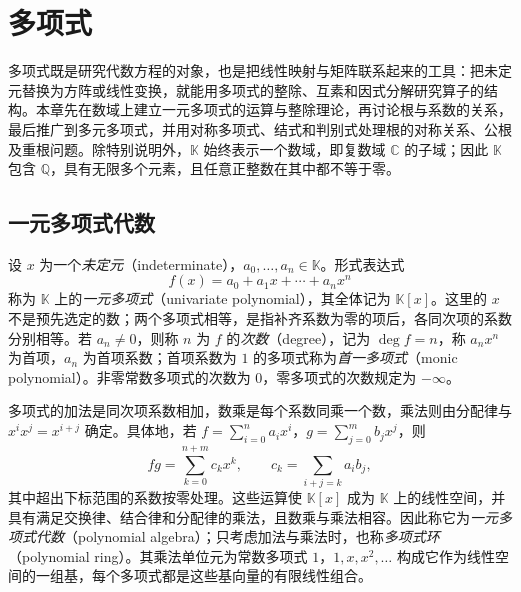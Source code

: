 \setcounter{chapter}{4} %
\chapter{多项式}
\label{chap:polynomials}

多项式既是研究代数方程的对象，也是把线性映射与矩阵联系起来的工具：把未定元替换为方阵或线性变换，就能用多项式的整除、互素和因式分解研究算子的结构。本章先在数域上建立一元多项式的运算与整除理论，再讨论根与系数的关系，最后推广到多元多项式，并用对称多项式、结式和判别式处理根的对称关系、公根及重根问题。除特别说明外，$\mathbb K$ 始终表示一个数域，即复数域 $\mathbb C$ 的子域；因此 $\mathbb K$ 包含 $\mathbb Q$，具有无限多个元素，且任意正整数在其中都不等于零。

\section{一元多项式代数}
\label{sec:polynomial-algebra}

\begin{definition}
设 $x$ 为一个\emph{未定元}（indeterminate），$a_0,\ldots,a_n\in\mathbb K$。形式表达式
\[
    f(x)=a_0+a_1x+\cdots+a_nx^n
\]
称为 $\mathbb K$ 上的\emph{一元多项式}（univariate polynomial），其全体记为 $\mathbb K[x]$。这里的 $x$ 不是预先选定的数；两个多项式相等，是指补齐系数为零的项后，各同次项的系数分别相等。若 $a_n\ne0$，则称 $n$ 为 $f$ 的\emph{次数}（degree），记为 $\deg f=n$，称 $a_nx^n$ 为首项，$a_n$ 为首项系数；首项系数为 $1$ 的多项式称为\emph{首一多项式}（monic polynomial）。非零常数多项式的次数为 $0$，零多项式的次数规定为 $-\infty$。
\end{definition}

多项式的加法是同次项系数相加，数乘是每个系数同乘一个数，乘法则由分配律与 $x^ix^j=x^{i+j}$ 确定。具体地，若 $f=\sum_{i=0}^n a_ix^i$，$g=\sum_{j=0}^m b_jx^j$，则
\[
    fg=\sum_{k=0}^{n+m}c_kx^k,
    \qquad c_k=\sum_{i+j=k}a_ib_j,
\]
其中超出下标范围的系数按零处理。这些运算使 $\mathbb K[x]$ 成为 $\mathbb K$ 上的线性空间，并具有满足交换律、结合律和分配律的乘法，且数乘与乘法相容。因此称它为\emph{一元多项式代数}（polynomial algebra）；只考虑加法与乘法时，也称\emph{多项式环}（polynomial ring）。其乘法单位元为常数多项式 $1$，$1,x,x^2,\ldots$ 构成它作为线性空间的一组基，每个多项式都是这些基向量的有限线性组合。

